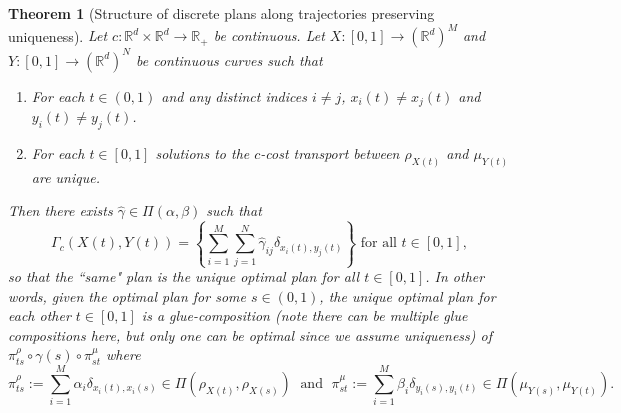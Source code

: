 \documentclass[11pt, oneside, titlepage]{book}
\theoremstyle{plain}
\newtheorem{theorem}{Theorem}[chapter]
\theoremstyle{definition}
\newcommand{\R}{\mathbb{R}}
\begin{document}
\begin{theorem}[Structure of discrete plans along trajectories preserving uniqueness]
\label{thrm: structure of discrete plans new notation}
Let $c: \R^d \times \R^d \to \R_+$ be continuous. Let $X: [0, 1] \to (\R^d)^M$ and $Y : [0, 1] \to (\R^d)^N$ be continuous curves such that
\begin{enumerate}[label = (\roman*)]
    \item \label{enum: distinct points (0, 1)} For each $t \in (0, 1)$ and any distinct indices $i \neq j$, $x_i(t) \neq x_j(t)$ and $y_i(t) \neq y_j(t)$.
    \item \label{enum: unique solutions for each pb} For each $t \in [0, 1]$ solutions to the $c$-cost transport between $\rho_{X(t)}$ and $\mu_{Y(t)}$ are unique.
\end{enumerate}
Then there exists $\hat{\gamma} \in \Pi(\alpha, \beta)$ such that
\begin{equation*}
    \Gamma_c(X(t), Y(t)) = \left\{ \sum_{i = 1}^{M}\sum_{j=1}^N \hat\gamma_{ij} \delta_{x_i(t), y_j(t)} \right\} \text{ for all } t \in [0, 1],
\end{equation*}
so that the ``same" plan is the unique optimal plan for all $t \in [0, 1]$. In other words, given the optimal plan for some $s \in (0, 1)$, the unique optimal plan for each other $t \in [0, 1]$ is a glue-composition (note there can be multiple glue compositions here, but only one can be optimal since we assume uniqueness) of $ \pi_{ts}^\rho \circ \gamma(s) \circ \pi_{st}^\mu$ where
\begin{equation*}
    \pi_{ts}^\rho := \sum_{i = 1}^M \alpha_i \delta_{x_i(t), x_i(s)} \in \Pi(\rho_{X(t)}, \rho_{X(s)})\; \text{ and } \; \pi_{st}^\mu :=\sum_{i = 1}^M \beta_i \delta_{y_i(s), y_i(t)} \in \Pi(\mu_{Y(s)}, \mu_{Y(t)}).
\end{equation*}
\end{theorem}
\end{document}

